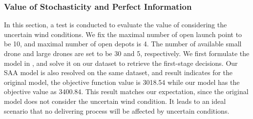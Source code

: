 \documentclass[preprint,review,11pt,authoryear]{elsarticle}
\begin{document}
\subsubsection{Value of Stochasticity and Perfect Information} \label{subsubsec:stochasticity}
In this section, a test is conducted to evaluate the value of considering the uncertain wind conditions. We fix the maximal number of open launch point to be 10, and maximal number of open depots is 4. The number of available small drone and large drones are set to be 30 and 5, respectively. We first formulate the model in \cite{dukkanci2023drones}, and solve it on our dataset to retrieve the first-stage decisions. Our SAA model is also resolved on the same dataset, and result indicates for the original model, the objective function value is 3018.54 while our model has the objective value as 3400.84. This result matches our expectation, since the original model does not consider the uncertain wind condition. It leads to an ideal scenario that no delivering process will be affected by uncertain conditions. 
\begin{table}[!htp]
    \centering
    \caption{Scenario Analysis with New Model and Original Model}
    \label{tab:scenario_analysis}
\end{table}
\end{document}
